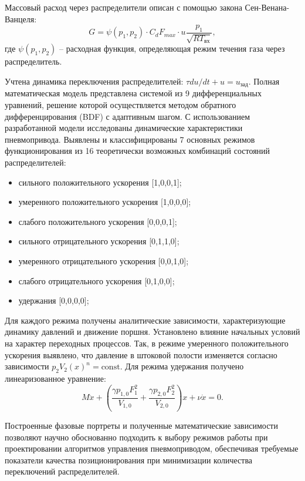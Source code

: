 Массовый расход через распределители описан с помощью закона Сен-Венана-Ванцеля:
\begin{equation}
	G = \psi(p_1, p_2) \cdot C_d F_{max} \cdot u \frac{p_1}{\sqrt{RT_\text{вх}}},
\end{equation}
где $\psi(p_1, p_2)$ -- расходная функция, определяющая режим течения газа через распределитель.

Учтена динамика переключения распределителей: $\tau du/dt + u = u_{\text{зад}}$.
Полная математическая модель представлена системой из 9 дифференциальных уравнений,
решение которой осуществляется методом обратного дифференцирования (BDF) с адаптивным шагом.
С использованием разработанной модели исследованы динамические
характеристики пневмопривода. Выявлены и классифицированы 7
основных режимов функционирования из 16 теоретически возможных комбинаций состояний распределителей:

\begin{itemize}
	\item сильного положительного ускорения [1,0,0,1];
	\item умеренного положительного ускорения [1,0,0,0];
	\item слабого положительного ускорения [0,0,0,1];
	\item сильного отрицательного ускорения [0,1,1,0];
	\item умеренного отрицательного ускорения [0,0,1,0];
	\item слабого отрицательного ускорения [0,1,0,0];
	\item удержания [0,0,0,0];
\end{itemize}

Для каждого режима получены аналитические зависимости, характеризующие
динамику давлений и движение поршня. Установлено влияние
начальных условий на характер переходных процессов. Так, в режиме
умеренного положительного ускорения выявлено, что давление в штоковой полости
изменяется согласно зависимости $p_2V_2(x)^n = \text{const}$. Для режима удержания получено линеаризованное уравнение:
\begin{equation}
	M\ddot{x} + \left(\frac{\gamma p_{1,0}F_1^2}{V_{1,0}} + \frac{\gamma p_{2,0}F_2^2}{V_{2,0}}\right)x + \nu\dot{x} = 0.
\end{equation}

Построенные фазовые портреты и полученные математические зависимости позволяют
научно обоснованно подходить к выбору режимов работы при проектировании
алгоритмов управления пневмоприводом, обеспечивая требуемые показатели качества
позиционирования при минимизации количества переключений распределителей.


